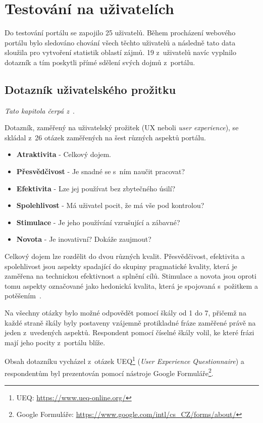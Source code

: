 \section{Testování na uživatelích}
Do testování portálu se zapojilo 25 uživatelů. Během procházení webového portálu bylo sledováno chování všech těchto uživatelů a následně tato data sloužila pro vytvoření statistik oblastí zájmů. 19 z~uživatelů navíc vyplnilo dotazník a tím poskytli přímé sdělení svých dojmů z~portálu. 

\subsection{Dotazník uživatelského prožitku}
\emph{Tato kapitola čerpá z~\cite{bib:ueq}}.

Dotazník, zaměřený na uživatelský prožitek (UX neboli \emph{user experience}), se skládal z~26 otázek zaměřených na šest různých aspektů portálu.
\begin{itemize}
    \item \textbf{Atraktivita} - Celkový dojem.
    \item \textbf{Přesvědčivost} - Je snadné se s~ním naučit pracovat?
    \item \textbf{Efektivita} - Lze jej používat bez zbytečného úsilí?
    \item \textbf{Spolehlivost} - Má uživatel pocit, že má vše pod kontrolou?
    \item \textbf{Stimulace} - Je jeho používání vzrušující a zábavné?
    \item \textbf{Novota} - Je inovativní? Dokáže zaujmout?
\end{itemize}
Celkový dojem lze rozdělit do dvou různých kvalit. Přesvědčivost, efektivita a spolehlivost jsou aspekty spadající do skupiny pragmatické kvality, která je zaměřena na technickou efektivnost a splnění cílů. Stimulace a novota jsou oproti tomu aspekty označované jako hedonická kvalita, která je spojovaná s~požitkem a potěšením~\cite{bib:hedonic}.

Na všechny otázky bylo možné odpovědět pomocí škály od 1 do 7, přičemž na každé straně škály byly postaveny vzájemně protikladné fráze zaměřené právě na jeden z~uvedených aspektů. Respondent pomocí číselné škály volil, ke které frázi mají jeho pocity z~portálu blíže.

Obsah dotazníku vycházel z~otázek UEQ\footnote{UEQ: \url{https://www.ueq-online.org/}} (\emph{User Experience Questionnaire}) a respondentům byl prezentován pomocí nástroje Google Formuláře\footnote{Google Formuláře: \url{https://www.google.com/intl/cs_CZ/forms/about/}}.

